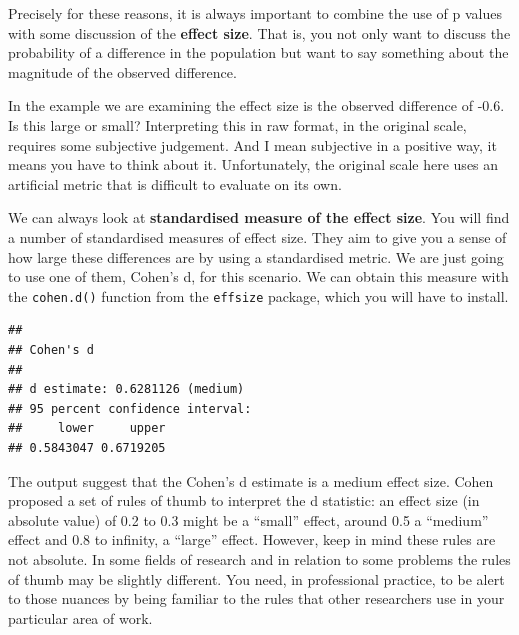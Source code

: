 \documentclass[]{book}
\newenvironment{Shaded}{\begin{snugshade}}{\end{snugshade}}
\newcommand{\DataTypeTok}[1]{\textcolor[rgb]{0.13,0.29,0.53}{#1}}
\newcommand{\KeywordTok}[1]{\textcolor[rgb]{0.13,0.29,0.53}{\textbf{#1}}}
\newcommand{\NormalTok}[1]{#1}
\newcommand{\OperatorTok}[1]{\textcolor[rgb]{0.81,0.36,0.00}{\textbf{#1}}}
\newcommand{\OtherTok}[1]{\textcolor[rgb]{0.56,0.35,0.01}{#1}}
\newcommand{\StringTok}[1]{\textcolor[rgb]{0.31,0.60,0.02}{#1}}
\theoremstyle{definition}
\theoremstyle{definition}
\theoremstyle{definition}
\theoremstyle{remark}
\begin{document}
Precisely for these reasons, it is always important to combine the use
of p values with some discussion of the \textbf{effect size}. That is,
you not only want to discuss the probability of a difference in the
population but want to say something about the magnitude of the observed
difference.

In the example we are examining the effect size is the observed
difference of -0.6. Is this large or small? Interpreting this in raw
format, in the original scale, requires some subjective judgement. And I
mean subjective in a positive way, it means you have to think about it.
Unfortunately, the original scale here uses an artificial metric that is
difficult to evaluate on its own.

We can always look at \textbf{standardised measure of the effect size}.
You will find a number of standardised measures of effect size. They aim
to give you a sense of how large these differences are by using a
standardised metric. We are just going to use one of them, Cohen's d,
for this scenario. We can obtain this measure with the
\texttt{cohen.d()} function from the \texttt{effsize} package, which you
will have to install.

\begin{Shaded}
\end{Shaded}

\begin{verbatim}
## 
## Cohen's d
## 
## d estimate: 0.6281126 (medium)
## 95 percent confidence interval:
##     lower     upper 
## 0.5843047 0.6719205
\end{verbatim}

The output suggest that the Cohen's d estimate is a medium effect size.
Cohen proposed a set of rules of thumb to interpret the d statistic: an
effect size (in absolute value) of 0.2 to 0.3 might be a ``small''
effect, around 0.5 a ``medium'' effect and 0.8 to infinity, a ``large''
effect. However, keep in mind these rules are not absolute. In some
fields of research and in relation to some problems the rules of thumb
may be slightly different. You need, in professional practice, to be
alert to those nuances by being familiar to the rules that other
researchers use in your particular area of work.
\end{document}
